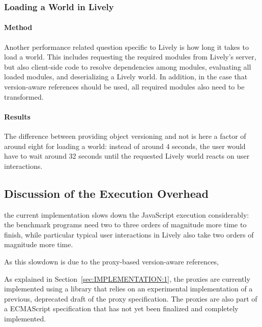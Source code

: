 \subsubsection{Loading a World in Lively}

\paragraph{Method}
Another performance related question specific to Lively is how long it takes to load a world.
This includes requesting the required modules from Lively's server, but also client-side code to resolve dependencies among modules, evaluating all loaded modules, and deserializing a Lively world.
In addition, in the case that version-aware references should be used, all required modules also need to be transformed.

\paragraph{Results}
The difference between providing object versioning and not is here a factor of around eight for loading a world: instead of around 4 seconds, the user would have to wait around 32 seconds until the requested Lively world reacts on user interactions.



\subsection{Discussion of the Execution Overhead}

the current implementation slows down the JavaScript execution considerably: the benchmark programs need two to three orders of magnitude more time to finish, while particular typical user interactions in Lively also take two orders of magnitude more time.

As this slowdown is due to the proxy-based version-aware references,

As explained in Section~\ref{sec:IMPLEMENTATION:1}, the proxies are currently implemented using a library that relies on an experimental implementation of a previous, deprecated draft of the proxy specification.
The proxies are also part of a ECMAScript specification that has not yet been finalized and completely implemented.



